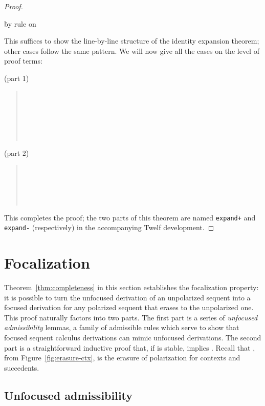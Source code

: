 \documentclass[acmtocl]{robtrans}\pdfoutput=1
\begin{document}
\begin{proof}
\begin{description}
\begin{tabbing}
  \` by rule  on 
\end{tabbing}
\end{description}
This suffices to show the line-by-line structure of the identity
expansion theorem; other cases follow the same pattern. We will now
give all the cases on the level of proof terms:

\bigskip
\fbox{} (part 1) 
\begin{quote}
\\
\\
\\
\\
\\

\end{quote}

\medskip
\clearpage\fbox{} (part 2) 
\begin{quote}
\\
\\
\\
\\

\end{quote}


\noindent
This completes the proof; the two parts of this theorem are named
{\tt expand+} and {\tt expand-} (respectively) 
in the accompanying Twelf development.
\end{proof}

\section{Focalization}
\label{sec:focalization}

Theorem~\ref{thm:completeness} in this section establishes the
focalization property: it is possible to turn the 
unfocused derivation of an unpolarized sequent into a focused derivation
for any polarized sequent that erases to the unpolarized one. This
proof naturally factors into two parts. The first part is a series of
{\it unfocused admissibility} lemmas, a family of admissible rules
which serve to show that focused sequent calculus derivations can
mimic unfocused derivations.  The second part is a straightforward
inductive proof that, if  is stable,
 implies
. Recall that , from
Figure~\ref{fig:erasure-ctx}, is the erasure of polarization for
contexts and succedents.


\subsection{Unfocused admissibility}\label{sec:unfocusedadmissibility}
\end{document}
